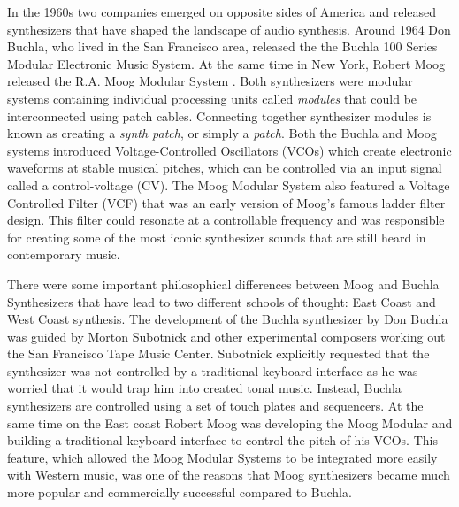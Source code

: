 In the 1960s two companies emerged on opposite sides of America and released synthesizers that have shaped the landscape of audio synthesis. Around 1964 Don Buchla, who lived in the San Francisco area, released the the Buchla 100 Series Modular Electronic Music System. At the same time in New York, Robert Moog released the R.A. Moog Modular System \cite{mcguire2015musical}. Both synthesizers were modular systems containing individual processing units called \textit{modules} that could be interconnected using patch cables. Connecting together synthesizer modules is known as creating a \textit{synth patch}, or simply a \textit{patch}. Both the Buchla and Moog systems introduced Voltage-Controlled Oscillators (VCOs) which create electronic waveforms at stable musical pitches, which can be controlled via an input signal called a control-voltage (CV). The Moog Modular System also featured a Voltage Controlled Filter (VCF) that was an early version of Moog's famous ladder filter design. This filter could resonate at a controllable frequency and was responsible for creating some of the most iconic synthesizer sounds that are still heard in contemporary music.

There were some important philosophical differences between Moog and Buchla Synthesizers that have lead to two different schools of thought: East Coast and West Coast synthesis. The development of the Buchla synthesizer by Don Buchla was guided by Morton Subotnick and other experimental composers working out the San Francisco Tape Music Center. Subotnick explicitly requested that the synthesizer was not controlled by a traditional keyboard interface as he was worried that it would trap him into created tonal music. Instead, Buchla synthesizers are controlled using a set of touch plates and sequencers. At the same time on the East coast Robert Moog was developing the Moog Modular and building a traditional keyboard interface to control the pitch of his VCOs. This feature, which allowed the Moog Modular Systems to be integrated more easily with Western music, was one of the reasons that Moog synthesizers became much more popular and commercially successful compared to Buchla. 


